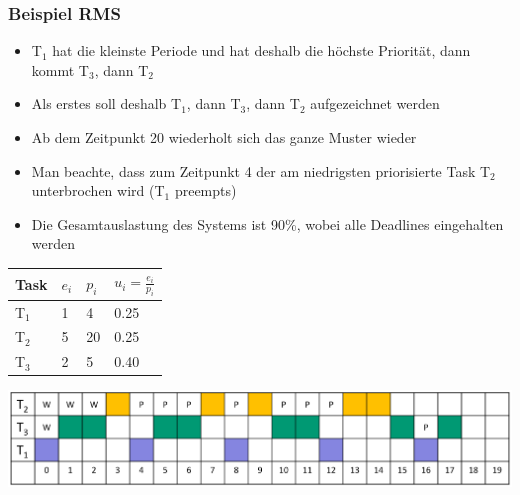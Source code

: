 \subsubsection{Beispiel RMS}
\begin{itemize}
  \item T$_1$ hat die kleinste Periode und hat deshalb die höchste Priorität, dann kommt T$_3$, dann T$_2$
  \item Als erstes soll deshalb T$_1$, dann T$_3$, dann T$_2$ aufgezeichnet werden
  \item Ab dem Zeitpunkt 20 wiederholt sich das ganze Muster wieder
  \item Man beachte, dass zum Zeitpunkt 4 der am niedrigsten priorisierte Task T$_2$ unterbrochen wird (T$_1$ preempts)
  \item Die Gesamtauslastung des Systems ist 90\%, wobei alle Deadlines eingehalten werden
\end{itemize}
\begin{minipage}[t]{0.3\linewidth}
	\begin{tabular}{| l | l | l | l |}
		\hline
		Task & $e_i$ & $p_i$ & $u_i=\frac{e_i}{p_i}$ \\
		\hline
		T$_1$ & 1 & 4 & 0.25 \\
		\hline
		T$_2$ & 5 & 20 & 0.25 \\
		\hline
		T$_3$ & 2 & 5 & 0.40 \\
		\hline
	\end{tabular}
\end{minipage}
\begin{minipage}[c]{0.7\linewidth}
	\includegraphics[width=\linewidth]{images/Schedule/RMS}
\end{minipage}

